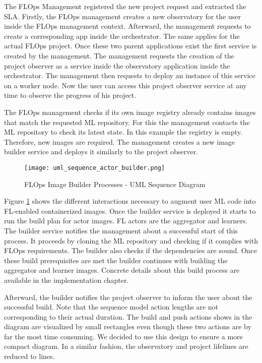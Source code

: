 The FLOps Management registered the new project request and extracted the SLA.
Firstly, the FLOps management creates a new observatory for the user inside the FLOps management context.
Afterward, the management requests to create a corresponding app inside the orchestrator.
The same applies for the actual FLOps project.
Once these two parent applications exist the first service is created by the management.
The management requests the creation of the project observer as a service inside the observatory application inside the orchestrator.
The management then requests to deploy an instance of this service on a worker node.
Now the user can access this project observer service at any time to observe the progress of his project.

The FLOps management checks if its own image registry already contains images that match the requested ML repository.
For this the management contacts the ML repository to check its latest state.
In this example the registry is empty.
Therefore, new images are required.
The management creates a new image builder service and deploys it similarly to the project observer.

\begin{figure}[h]
    \begin{adjustwidth}{-0.2\paperwidth}{-0.2\paperwidth}
        \centering
        \texttt{[image: uml\_sequence\_actor\_builder.png]}
        \caption{FLOps Image Builder Processes - UML Sequence Diagram}
        \label{fig:uml_sequence_builder}
    \end{adjustwidth}
\end{figure}

Figure \ref{fig:uml_sequence_builder} shows the different interactions necessary to augment user ML code into FL-enabled containerized images.
Once the builder service is deployed it starts to run the build plan for actor images.
FL actors are the aggregator and learners.
The builder service notifies the management about a successful start of this process.
It proceeds by cloning the ML repository and checking if it complies with FLOps requirements.
The builder also checks if the dependencies are sound.
Once these build prerequisites are met the builder continues with building the aggregator and learner images.
Concrete details about this build process are available in the implementation chapter.

Afterward, the builder notifies the project observer to inform the user about the successful build.
Note that the sequence model action lengths are not corresponding to their actual duration.
The build and push actions shows in the diagram are visualized by small rectangles even though these two actions are by far the most time consuming.
We decided to use this design to ensure a more compact diagram.
In a similar fashion, the observatory and project lifelines are reduced to lines.

